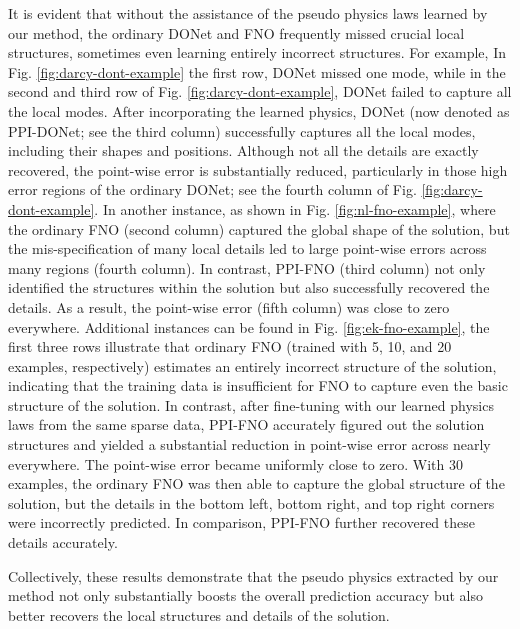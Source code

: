 It is evident that without the assistance of the pseudo physics laws learned by our method, the ordinary DONet and FNO frequently missed crucial local structures, sometimes even learning entirely incorrect structures.
For example, In Fig. \ref{fig:darcy-dont-example} the first row, DONet missed one mode, while in the second and third row of Fig. \ref{fig:darcy-dont-example}, DONet failed to capture all the local modes. 
After incorporating the learned physics, DONet (now denoted as PPI-DONet; see the third column) successfully captures all the local modes, including their shapes and positions. Although not all the details are exactly recovered, the point-wise error is substantially reduced, particularly in those high error regions of the ordinary DONet; see the fourth column of Fig. \ref{fig:darcy-dont-example}.
In another instance, as shown in Fig. \ref{fig:nl-fno-example}, where the ordinary FNO (second column) captured the global shape of the solution, but the mis-specification of many local details led to large point-wise errors across many regions (fourth column). In contrast, PPI-FNO (third column) not only identified the structures within the solution but also successfully recovered the details. As a result, the point-wise error (fifth column) was close to zero everywhere.
Additional instances can be found in Fig. \ref{fig:ek-fno-example}, the first three rows illustrate that ordinary FNO (trained with 5, 10, and 20 examples, respectively) estimates an entirely incorrect structure of the solution, indicating that the training data is insufficient for FNO to capture even the basic structure of the solution. In contrast, after fine-tuning with our learned physics laws from the same sparse data, PPI-FNO accurately figured out the solution structures and yielded a substantial reduction in point-wise error across nearly everywhere. The point-wise error became uniformly close to zero.
With 30 examples, the ordinary FNO was then able to capture the global structure of the solution, but the details in the bottom left, bottom right, and top right corners were incorrectly predicted. In comparison, PPI-FNO further recovered these details accurately. 




Collectively, these results demonstrate that the pseudo physics extracted by our method not only substantially boosts the overall prediction accuracy but also better recovers the local structures and details of the solution.

